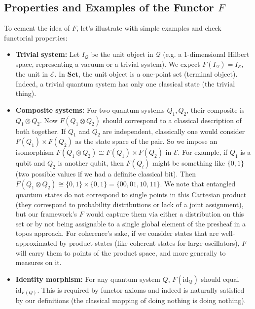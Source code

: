 \subsection{Properties and Examples of the Functor $F$}

To cement the idea of $F$, let's illustrate with simple examples and check functorial properties:

\begin{itemize}
    \item \textbf{Trivial system:} Let $I_{\mathcal{Q}}$ be the unit object in $\mathcal{Q}$ (e.g. a 1-dimensional Hilbert space, representing a vacuum or a trivial system). We expect $F(I_{\mathcal{Q}}) = I_{\mathcal{E}}$, the unit in $\mathcal{E}$. In $\mathbf{Set}$, the unit object is a one-point set (terminal object). Indeed, a trivial quantum system has only one classical state (the trivial thing).
    
    \item \textbf{Composite systems:} For two quantum systems $Q_1, Q_2$, their composite is $Q_1 \otimes Q_2$. Now $F(Q_1 \otimes Q_2)$ should correspond to a classical description of both together. If $Q_1$ and $Q_2$ are independent, classically one would consider $F(Q_1) \times F(Q_2)$ as the state space of the pair. So we impose an isomorphism $F(Q_1 \otimes Q_2) \cong F(Q_1)\times F(Q_2)$ in $\mathcal{E}$. For example, if $Q_1$ is a qubit and $Q_2$ is another qubit, then $F(Q_i)$ might be something like $\{0,1\}$ (two possible values if we had a definite classical bit). Then $F(Q_1\otimes Q_2) \cong \{0,1\} \times \{0,1\} = \{00, 01, 10, 11\}$. We note that entangled quantum states do not correspond to single points in this Cartesian product (they correspond to probability distributions or lack of a joint assignment), but our framework's $F$ would capture them via either a distribution on this set or by not being assignable to a single global element of the presheaf in a topos approach. For coherence's sake, if we consider states that are well-approximated by product states (like coherent states for large oscillators), $F$ will carry them to points of the product space, and more generally to measures on it.
    
    \item \textbf{Identity morphism:} For any quantum system $Q$, $F(\mathrm{id}_Q)$ should equal $\mathrm{id}_{F(Q)}$. This is required by functor axioms and indeed is naturally satisfied by our definitions (the classical mapping of doing nothing is doing nothing).
    

\end{itemize}
